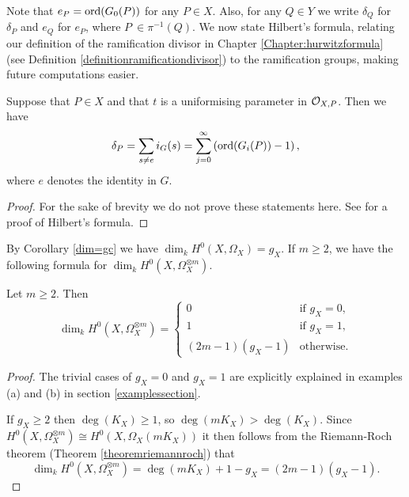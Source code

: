 Note that $e_P = \operatorname{ord} (G_0(P))$ for any $P \in X$.
Also, for any $Q \in Y$ we write $\delta_Q$ for $\delta_P$ and $e_Q$ for $e_P$, where $P\ \in \pi^{-1}(Q)$.
We now state Hilbert's formula, relating our definition of the ramification divisor in Chapter \ref{Chapter:hurwitzformula} (see Definition \ref{definitionramificationdivisor}) to the ramification groups, making future computations easier.


    \begin{thm}\label{hilbertsformula}
    Suppose that $P\in X$ and that $t$ is a uniformising parameter in ${\cal O}_{X,P}$.
    Then we have
        \begin{equation}
        \delta_P = \sum_{s\neq e}i_G(s)=\sum_{j=0}^{\infty}\left(\operatorname{ord}(G_i(P))-1\right),\label{ramdiv}
        \end{equation}
    where $e$ denotes the identity in $G$.
    \end{thm}
    \begin{proof}
    For the sake of brevity we do not prove these statements here. See \cite[Chap. IV, \S 1, Prop. 4]{localfields} for a proof of Hilbert's formula.
    \end{proof}

By Corollary \ref{dim=gc} we have $\dim_kH^0(X,\Omega_X)=g_X$.
If $m\geq 2$, we have the following formula for $\dim_kH^0(X,\Omega_X^{\otimes m})$.

    \begin{lem}\label{dim3}
    Let $m\geq 2$. Then
        \begin{equation}
        \dim_kH^0(X,\Omega_X^{\otimes m}) =
            \begin{cases}
            0 & \mbox{if } g_X=0,\\
            1 & \mbox{if } g_X=1,\\
            (2m-1)(g_X-1) & \mbox{otherwise}.
            \end{cases}
        \end{equation}
    \end{lem}
    \begin{proof}
    The trivial cases of $g_X =0$ and $g_X=1$ are explicitly explained in examples (a) and (b) in section \ref{examplessection}.
    
    If $g_X\geq 2$ then $\deg(K_X)\geq1$, so $\deg(mK_X)>\deg(K_X)$.
    Since $H^0(X,\Omega_X^{\otimes m}) \cong H^0(X,\Omega_X(mK_X))$ it then follows from the Riemann-Roch theorem (Theorem \ref{theoremriemannroch}) that
        \[
        \dim_kH^0(X,\Omega_X^{\otimes m})=\deg(mK_X)+1-g_X=(2m-1)(g_X-1).
        \]
    \end{proof}

